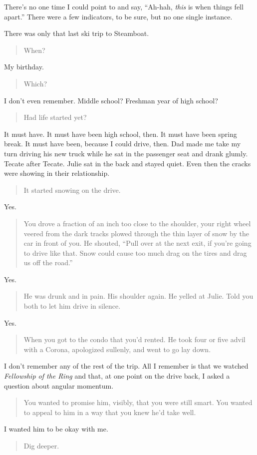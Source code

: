 There's no one time I could point to and say, ``Ah-hah, \emph{this} is when things fell apart.'' There were a few indicators, to be sure, but no one single instance.

There was only that last ski trip to Steamboat.

\begin{quote}
When?
\end{quote}

My birthday.

\begin{quote}
Which?
\end{quote}

I don't even remember. Middle school? Freshman year of high school?

\begin{quote}
Had life started yet?
\end{quote}

It must have. It must have been high school, then. It must have been spring break. It must have been, because I could drive, then. Dad made me take my turn driving his new truck while he sat in the passenger seat and drank glumly. Tecate after Tecate. Julie sat in the back and stayed quiet. Even then the cracks were showing in their relationship.

\begin{quote}
It started snowing on the drive.
\end{quote}

Yes.

\begin{quote}
You drove a fraction of an inch too close to the shoulder, your right wheel veered from the dark tracks plowed through the thin layer of snow by the car in front of you. He shouted, ``Pull over at the next exit, if you're going to drive like that. Snow could cause too much drag on the tires and drag us off the road.''
\end{quote}

Yes.

\begin{quote}
He was drunk and in pain. His shoulder again. He yelled at Julie. Told you both to let him drive in silence.
\end{quote}

Yes.

\begin{quote}
When you got to the condo that you'd rented. He took four or five advil with a Corona, apologized sullenly, and went to go lay down.
\end{quote}

I don't remember any of the rest of the trip. All I remember is that we watched \emph{Fellowship of the Ring} and that, at one point on the drive back, I asked a question about angular momentum.

\begin{quote}
You wanted to promise him, visibly, that you were still smart. You wanted to appeal to him in a way that you knew he'd take well.
\end{quote}

I wanted him to be okay with me.

\begin{quote}
Dig deeper.
\end{quote}
